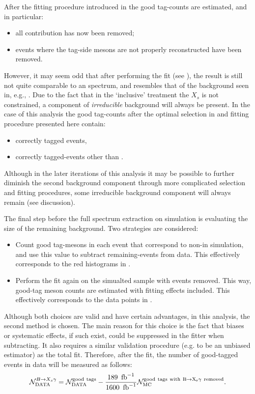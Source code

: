 After the fitting procedure introduced in  the good tag-\B counts are estimated, and in particular:
\begin{itemize}
    \item all \epem\ra\qqbar contribution has now been removed;
    \item events where the tag-side \B mesons are not properly reconstructed have been removed.
\end{itemize}

However, it may seem odd that after performing the \Mbc fit (see ), the result is still not quite comparable to an \EB spectrum,
and resembles that of the background seen in, e.g., .
Due to the fact that in the `inclusive' treatment the $X_s$ is not constrained, a component of \textit{irreducible} background will always be present.
In the case of this analysis the good tag-\B counts after the optimal selection in  and fitting procedure presented here contain:
\begin{itemize}
    \item correctly tagged \BtoXsgamma events,
    \item correctly tagged-\BB events other than \BtoXsgamma.
\end{itemize}
Although in the later iterations of this analysis it may be possible to further diminish the second background component through more complicated selection and fitting procedures, 
some irreducible background component will always remain (see discussion).

The final step before the full \BtoXsgamma spectrum extraction on simulation is evaluating the size of the remaining \BB background.
Two strategies are considered:
\begin{itemize}
    \item Count good tag-\B mesons in each event that correspond to non-\BtoXsgamma in simulation, and use this value to subtract remaining-\BB events from data.
    This effectively corresponds to the red histograms in .
    \item Perform the fit again on the simualted sample with \BtoXsgamma events removed.
    This way, good-tag \B meson counts are estimated with fitting effects included.
    This effectively corresponds to the data points in .
\end{itemize}
Although both choices are valid and have certain advantages, in this analysis, the second method is chosen.
The main reason for this choice is the fact that biases or systematic effects, if such exist, could be suppressed in the fitter when subtracting.
It also requires a similar validation procedure (e.g. to be an unbiased estimator) as the total fit.
Therefore, after the \Mbc fit, the number of good-tagged \BtoXsgamma events in data will be measured as follows:
\begin{equation}
    \mathcal{N}_{\mathrm{DATA}}^{\BtoXsgamma} = \mathcal{N}_{\mathrm{DATA}}^{\mathrm{good~tags}}  - \frac{189~\invfb}{1600~\invfb} \mathcal{N}_{\mathrm{MC}}^{\mathrm{good~tags~with~\BtoXsgamma~removed}}.
\end{equation}